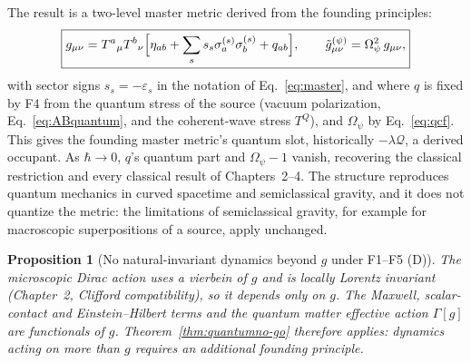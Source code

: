 \documentclass[11pt,a4paper]{article}
\newtheorem{proposition}[theorem]{Proposition}
\begin{document}
\noindent The result is a two-level master metric derived from the founding
principles:
\begin{equation}\label{eq:twolevel}
\boxed{g_{\mu\nu}=T^a{}_\mu T^b{}_\nu\Bigl[\eta_{ab}+\sum_ss_s\sigma^{(s)}_a\sigma^{(s)}_b+q_{ab}\Bigr],
\qquad \tilde g^{(\psi)}_{\mu\nu}=\Omega_\psi^2\,g_{\mu\nu},}
\end{equation}
with sector signs $s_s=-\varepsilon_s$ in the notation of Eq.~\eqref{eq:master}, and
where $q$ is fixed by F4 from the quantum stress of the source (vacuum
polarization, Eq.~\eqref{eq:ABquantum}, and the coherent-wave stress $T^Q$), and
$\Omega_\psi$ by Eq.~\eqref{eq:qcf}. This gives the founding master metric's quantum
slot, historically $-\lambda\mathcal Q$, a derived occupant. As $\hbar\to0$, $q$'s
quantum part and $\Omega_\psi-1$ vanish, recovering the classical restriction and
every classical result of Chapters~2--4. The structure reproduces quantum
mechanics in curved spacetime and semiclassical gravity, and it does not quantize
the metric: the limitations of semiclassical gravity, for example for macroscopic
superpositions of a source, apply unchanged.

\begin{proposition}[No natural-invariant dynamics beyond $g$ under F1--F5 (D)]\label{prop:nobeyond}
The microscopic Dirac action uses a vierbein of $g$ and is locally Lorentz invariant (Chapter~2,
Clifford compatibility), so it depends only on $g$. The Maxwell, scalar-contact and
Einstein--Hilbert terms and the quantum matter effective action $\Gamma[g]$ are
functionals of $g$. Theorem~\ref{thm:quantumno-go} therefore applies: dynamics
acting on more than $g$ requires an additional founding principle.
\end{proposition}
\end{document}
